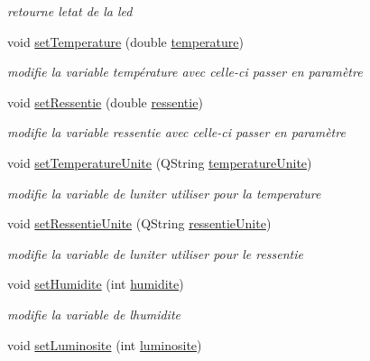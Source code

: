 \begin{DoxyCompactItemize}
\begin{DoxyCompactList}\small\item\em retourne l\textquotesingle{}etat de la led \end{DoxyCompactList}\item 
void \hyperlink{class_esp32_a8e7a509ed5704bee4bc527ae297f14f0}{set\+Temperature} (double \hyperlink{class_esp32_a8274802633ca34c07fbfe7fa38a171a8}{temperature})
\begin{DoxyCompactList}\small\item\em modifie la variable température avec celle-\/ci passer en paramètre \end{DoxyCompactList}\item 
void \hyperlink{class_esp32_a85dc760b771c9233fa094a49679d9286}{set\+Ressentie} (double \hyperlink{class_esp32_a08425470633629dae05f61659ff90375}{ressentie})
\begin{DoxyCompactList}\small\item\em modifie la variable ressentie avec celle-\/ci passer en paramètre \end{DoxyCompactList}\item 
void \hyperlink{class_esp32_a709c261e1cea7b6bbd2ea1b09b1d7ec0}{set\+Temperature\+Unite} (Q\+String \hyperlink{class_esp32_a825526f0d6b74fda9ddeba7e67ec9dd5}{temperature\+Unite})
\begin{DoxyCompactList}\small\item\em modifie la variable de l\textquotesingle{}uniter utiliser pour la temperature \end{DoxyCompactList}\item 
void \hyperlink{class_esp32_abf8a7f9942150b6c17cc5d1cc7b0fc8a}{set\+Ressentie\+Unite} (Q\+String \hyperlink{class_esp32_a5333681c08a07f1877c20cfe88b7024f}{ressentie\+Unite})
\begin{DoxyCompactList}\small\item\em modifie la variable de l\textquotesingle{}uniter utiliser pour le ressentie \end{DoxyCompactList}\item 
void \hyperlink{class_esp32_a029c94bf405887eb890b3381ac176a9a}{set\+Humidite} (int \hyperlink{class_esp32_a7ad1a81c0a3cb29035aaef89d153f662}{humidite})
\begin{DoxyCompactList}\small\item\em modifie la variable de l\textquotesingle{}humidite \end{DoxyCompactList}\item 
void \hyperlink{class_esp32_ae60b48e8c808a5108402d5b9f03590ac}{set\+Luminosite} (int \hyperlink{class_esp32_aa6ce86f87c88d7fd29880e9865fefefc}{luminosite})

\end{DoxyCompactItemize}
